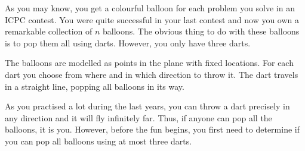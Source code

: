 

%
As you may know, you get a colourful balloon for each problem you solve in an ICPC contest.
You were quite successful in your last contest
and now you own a remarkable collection of $n$ balloons.
The obvious thing to do with these balloons is to pop them all using darts.
However, you only have three darts.

The balloons are modelled as points in the plane with fixed locations.
For each dart you choose from where and in which direction to throw it.
The dart travels in a straight line, popping all balloons in its way.

As you practised a lot during the last years,
you can throw a dart precisely in any direction and it will fly infinitely far.
Thus, if anyone can pop all the balloons, it is you. 
However, before the fun begins, you first need to determine
if you can pop all balloons using at most three darts.

